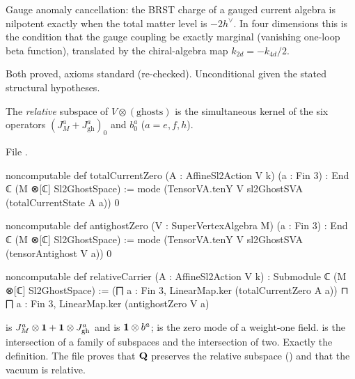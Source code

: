 \begin{physics}
Gauge anomaly cancellation: the BRST charge of a gauged current algebra is nilpotent exactly when the total matter level is
$-2h^\vee$. In four dimensions this is the condition that the gauge coupling be exactly marginal (vanishing one-loop beta function),
translated by the chiral-algebra map $k_{2d}=-k_{4d}/2$.
\end{physics}

\begin{status}
Both proved, axioms standard (re-checked). Unconditional given the stated structural hypotheses.
\end{status}

\begin{definition}\label{l28:def:relative}
The \emph{relative} subspace of $V\otimes(\text{ghosts})$ is the simultaneous kernel of the six operators $(J^a_M+J^a_{\mathrm{gh}})_0$
and $b^a_0$ ($a=e,f,h$).
\end{definition}

\noindent File .
\begin{leancode}
noncomputable def totalCurrentZero (A : AffineSl2Action V k) (a : Fin 3) :
    End ℂ (M ⊗[ℂ] Sl2GhostSpace) :=
  mode (TensorVA.tenY V sl2GhostSVA (totalCurrentState A a)) 0

noncomputable def antighostZero (V : SuperVertexAlgebra M) (a : Fin 3) :
    End ℂ (M ⊗[ℂ] Sl2GhostSpace) :=
  mode (TensorVA.tenY V sl2GhostSVA (tensorAntighost V a)) 0

noncomputable def relativeCarrier (A : AffineSl2Action V k) :
    Submodule ℂ (M ⊗[ℂ] Sl2GhostSpace) :=
  (⨅ a : Fin 3, LinearMap.ker (totalCurrentZero A a)) ⊓
    ⨅ a : Fin 3, LinearMap.ker (antighostZero V a)
\end{leancode}

\begin{dictionary}
 is $J^a_M\otimes\mathbf 1+\mathbf 1\otimes J^a_{\mathrm{gh}}$ and  is
$\mathbf 1\otimes b^a$;  is the zero mode of a weight-one field.  is the intersection of a family of
subspaces and  the intersection of two. Exactly the definition. The file proves that $\mathbf Q$ preserves the relative
subspace () and that the vacuum is relative.
\end{dictionary}

